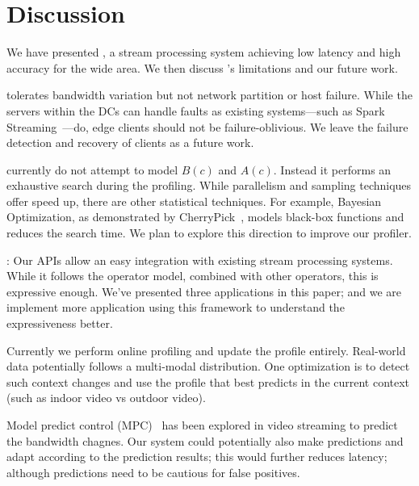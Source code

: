 \section{Discussion}
\label{sec:discussion}

We have presented \sysname{}, a stream processing system achieving low latency
and high accuracy for the wide area. We then discuss \sysname{}'s limitations
and our future work.

 \sysname{} tolerates bandwidth
variation but not network partition or host failure. While the servers within
the DCs can handle faults as existing systems---such as Spark
Streaming~\cite{zaharia2013discretized}---do, edge clients should not be
failure-oblivious. We leave the failure detection and recovery of clients as a
future work.

 \sysname{} currently do not attempt to model $B(c)$
and $A(c)$. Instead it performs an exhaustive search during the profiling. While
parallelism and sampling techniques offer speed up, there are other statistical
techniques. For example, Bayesian Optimization, as demonstrated by
CherryPick~\cite{alipourfard2017cherrypick}, models black-box functions and
reduces the search time. We plan to explore this direction to improve our
profiler.

: Our \maybe{} APIs allow an easy integration with existing
stream processing systems. While it follows the operator model, combined with
other operators, this is expressive enough. We've presented three applications
in this paper; and we are implement more application using this framework to
understand the expressiveness better.

 Currently we perform online profiling and update the
profile entirely. Real-world data potentially follows a multi-modal
distribution. One optimization is to detect such context changes and use the
profile that best predicts in the current context (such as indoor video vs
outdoor video).

 Model predict control
(MPC)~\cite{yin2015control} has been explored in video streaming to predict the
bandwidth chagnes. Our system could potentially also make predictions and adapt
according to the prediction results; this would further reduces latency;
although predictions need to be cautious for false positives.

